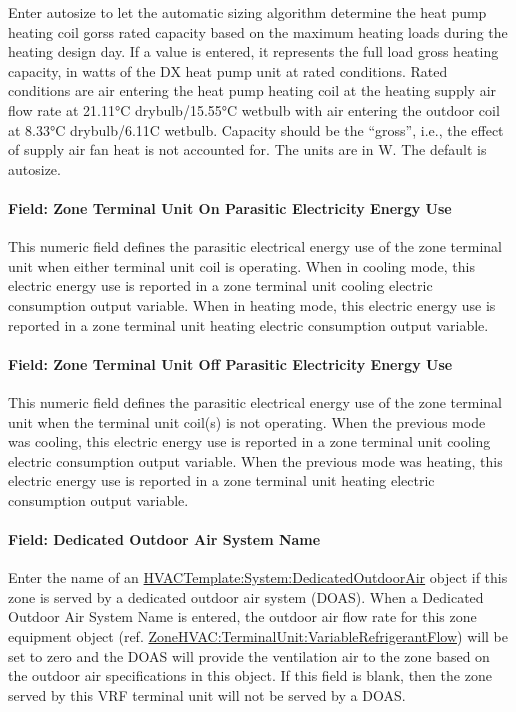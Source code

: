 Enter autosize to let the automatic sizing algorithm determine the heat pump heating coil gorss rated capacity based on the maximum heating loads during the heating design day. If a value is entered, it represents the full load gross heating capacity, in watts of the DX heat pump unit at rated conditions. Rated conditions are air entering the heat pump heating coil at the heating supply air flow rate at 21.11°C drybulb/15.55°C wetbulb with air entering the outdoor coil at 8.33°C drybulb/6.11C wetbulb. Capacity should be the ``gross'', i.e., the effect of supply air fan heat is not accounted for. The units are in W. The default is autosize.

\paragraph{Field: Zone Terminal Unit On Parasitic Electricity Energy Use}\label{field-zone-terminal-unit-on-parasitic-electric-energy-use}

This numeric field defines the parasitic electrical energy use of the zone terminal unit when either terminal unit coil is operating. When in cooling mode, this electric energy use is reported in a zone terminal unit cooling electric consumption output variable. When in heating mode, this electric energy use is reported in a zone terminal unit heating electric consumption output variable.

\paragraph{Field: Zone Terminal Unit Off Parasitic Electricity Energy Use}\label{field-zone-terminal-unit-off-parasitic-electric-energy-use}

This numeric field defines the parasitic electrical energy use of the zone terminal unit when the terminal unit coil(s) is not operating. When the previous mode was cooling, this electric energy use is reported in a zone terminal unit cooling electric consumption output variable. When the previous mode was heating, this electric energy use is reported in a zone terminal unit heating electric consumption output variable.

\paragraph{Field: Dedicated Outdoor Air System Name}\label{field-dedicated-outdoor-air-system-name-5}

Enter the name of an \hyperref[hvactemplatesystemdedicatedoutdoorair]{HVACTemplate:System:DedicatedOutdoorAir} object if this zone is served by a dedicated outdoor air system (DOAS). When a Dedicated Outdoor Air System Name is entered, the outdoor air flow rate for this zone equipment object (ref. \hyperref[zonehvacterminalunitvariablerefrigerantflow]{ZoneHVAC:TerminalUnit:VariableRefrigerantFlow}) will be set to zero and the DOAS will provide the ventilation air to the zone based on the outdoor air specifications in this object. If this field is blank, then the zone served by this VRF terminal unit will not be served by a DOAS.

